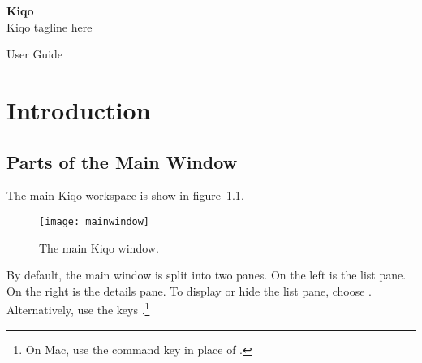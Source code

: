 \documentclass[11pt,fleqn]{book} %
\begin{document}

\begingroup
\thispagestyle{empty}
\centering
\vspace*{5cm}
\par\normalfont\fontsize{35}{35}\sffamily\selectfont
\textbf{Kiqo}\\
{\LARGE Kiqo tagline here}\par %
\vspace*{1cm}
{\Huge User Guide}\par %
\endgroup


\tableofcontents %


\chapter{Introduction}

\section{Parts of the Main Window}
The main Kiqo workspace is show in figure~\ref{fig:mainwindow}.

\begin{figure}[h]
  \centering
  \texttt{[image: mainwindow]}
  \caption{The main Kiqo window.\label{fig:mainwindow}}
\end{figure}

\pagebreak
By default, the main window is split into two panes.
On the left is the list pane.
On the right is the details pane.
To display or hide the list pane, choose .
Alternatively, use the keys .\footnote{On Mac,
use the command key \keys{\cmd} in place of \keys{\ctrl}.}
\end{document}
